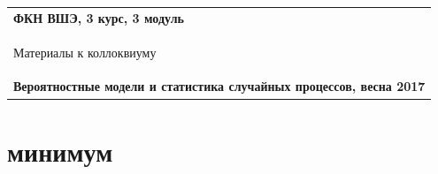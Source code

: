 \documentclass[a4paper,12pt]{extreport}
\renewcommand{\=}[1]{\stackrel{#1}{=}} %
\begin{document}
\begin{center}
    \begin{tabular}{|p{15.5cm}|}
        \hline
        \textbf{ФКН ВШЭ, 3 курс, 3 модуль}\\
        \begin{center} \Large Материалы к коллоквиуму
        \end{center}\\
        \textbf{Вероятностные модели и статистика случайных процессов, весна 2017}\\
        \hline
    \end{tabular}
\end{center}






\section*{ минимум}
\end{document}
